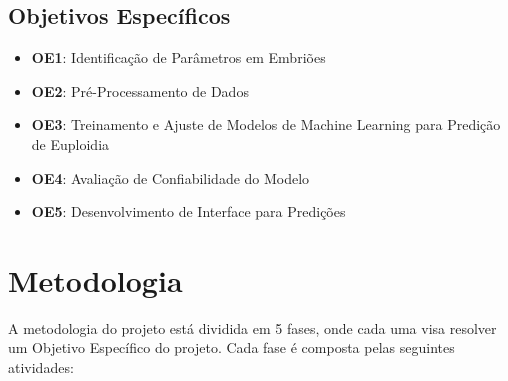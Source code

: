 \subsection{Objetivos Específicos}
\begin{itemize}
    \item \textbf{OE1}: Identificação de Parâmetros em Embriões
    \item \textbf{OE2}: Pré-Processamento de Dados
    \item \textbf{OE3}: Treinamento e Ajuste de Modelos de Machine Learning para Predição de Euploidia
    \item \textbf{OE4}: Avaliação de Confiabilidade do Modelo
    \item \textbf{OE5}: Desenvolvimento de Interface para Predições
\end{itemize}

\section{Metodologia}
A metodologia do projeto está dividida em 5 fases, onde cada uma visa resolver um Objetivo Específico do projeto. Cada fase é composta pelas seguintes atividades:

